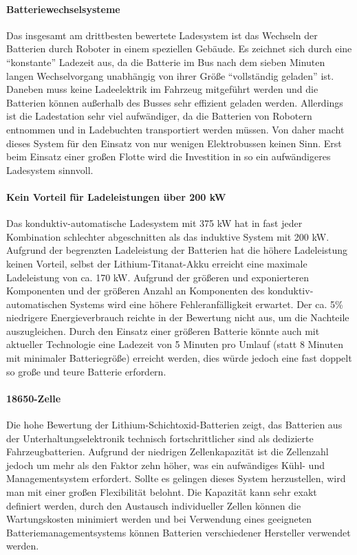 \paragraph{Batteriewechselsysteme} Das insgesamt am drittbesten bewertete Ladesystem ist das Wechseln der Batterien durch Roboter in einem speziellen Gebäude. Es zeichnet sich durch eine "`konstante"' Ladezeit aus, da die Batterie im Bus nach dem sieben Minuten langen Wechselvorgang unabhängig von ihrer Größe "`vollständig geladen"' ist. Daneben muss keine Ladeelektrik im Fahrzeug mitgeführt werden und die Batterien können außerhalb des Busses sehr effizient geladen werden. Allerdings ist die Ladestation sehr viel aufwändiger, da die Batterien  von Robotern entnommen und in Ladebuchten transportiert werden müssen. Von daher macht dieses System für den Einsatz von nur wenigen Elektrobussen keinen Sinn. Erst beim Einsatz einer großen Flotte wird die Investition in so ein aufwändigeres Ladesystem sinnvoll.

\paragraph{Kein Vorteil für Ladeleistungen über 200 kW} Das konduktiv-automatische Ladesystem mit 375 kW hat in fast jeder Kombination schlechter abgeschnitten als das induktive System mit 200 kW. Aufgrund der begrenzten Ladeleistung der Batterien hat die höhere Ladeleistung keinen Vorteil, selbst der Lithium-Titanat-Akku erreicht eine maximale Ladeleistung von ca. 170 kW. Aufgrund der größeren und exponierteren Komponenten und der größeren Anzahl an Komponenten des konduktiv-automatischen Systems wird eine höhere Fehleranfälligkeit erwartet. Der ca. 5\% niedrigere Energieverbrauch reichte in der Bewertung nicht aus, um die Nachteile auszugleichen. Durch den Einsatz einer größeren Batterie könnte auch mit aktueller Technologie eine Ladezeit von 5 Minuten pro Umlauf (statt 8 Minuten mit minimaler Batteriegröße) erreicht werden, dies würde jedoch eine fast doppelt so große und teure Batterie erfordern.

\paragraph{18650-Zelle} Die hohe Bewertung der Lithium-Schichtoxid-Batterien zeigt, das Batterien aus der Unterhaltungselektronik technisch fortschrittlicher sind als dedizierte Fahrzeugbatterien. Aufgrund der niedrigen Zellenkapazität ist die Zellenzahl jedoch um mehr als den Faktor zehn höher, was ein aufwändiges Kühl- und Managementsystem erfordert. Sollte es gelingen dieses System herzustellen, wird man mit einer großen Flexibilität belohnt. Die Kapazität kann sehr exakt definiert werden, durch den Austausch individueller Zellen können die Wartungskosten minimiert werden und bei Verwendung eines geeigneten Batteriemanagementsystems können Batterien verschiedener Hersteller verwendet werden.

